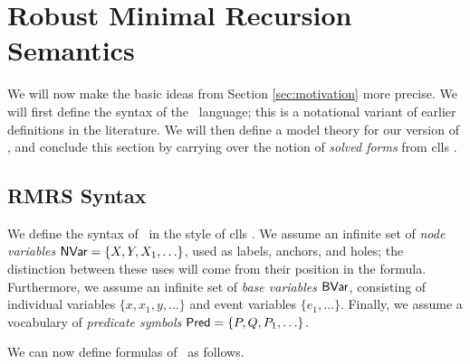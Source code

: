 \section{Robust Minimal Recursion Semantics}
\label{sec:rmrs}

We will now make the basic ideas from Section \ref{sec:motivation}
more precise.  We will first define the syntax of the \rmrs\ language;
this is a notational variant of earlier definitions in the
literature.  We will then define a model theory for our version of
\rmrs, and conclude this section by carrying over the notion of
\emph{solved forms} from {\sc clls} \cite{egg:etal:2001}.



\subsection{RMRS Syntax}

We define the syntax of \rmrs\ in the style of {\sc clls}
\cite{egg:etal:2001}.  We assume an infinite set of {\em node
  variables} $\mathsf{NVar}=\{X,Y,X_1,\ldots\}$, used as labels,
anchors, and holes; the distinction between these uses will come from
their position in the formula.  Furthermore, we assume an infinite set
of \emph{base variables} $\mathsf{BVar}$, consisting of individual variables
$\{x,x_1,y,\ldots\}$ and event variables $\{e_1,\ldots\}$.  Finally,
we assume a vocabulary of \emph{predicate symbols}
$\mathsf{Pred}=\{P,Q,P_1,\ldots\}$.

We can now define formulas of \rmrs\ as follows.

